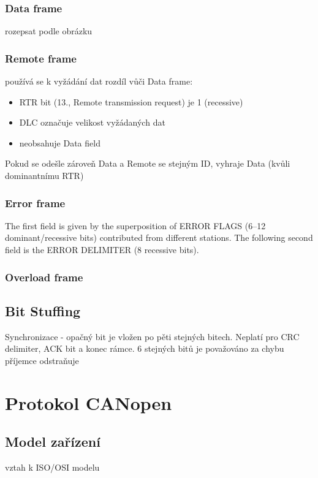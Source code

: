 \documentclass[
  field=ainfk,
  biblatex,
  glossaries,
  index
]{kidiplom}
\begin{document}
\subsubsection{Data frame}
rozepsat podle obrázku
\subsubsection{Remote frame}
používá se k vyžádání dat
rozdíl vůči Data frame:
\begin{itemize}
	\item RTR bit (13., Remote transmission request) je 1 (recessive)
	\item DLC označuje velikost vyžádaných dat
	\item neobsahuje Data field
\end{itemize}
Pokud se odešle zároveň Data a Remote se stejným ID, vyhraje Data (kvůli dominantnímu RTR)

\subsubsection{Error frame}
The first field is given by the superposition of ERROR FLAGS (6–12 dominant/recessive bits) contributed from different stations.
The following second field is the ERROR DELIMITER (8 recessive bits).

\subsubsection{Overload frame}

\subsection{Bit Stuffing}
Synchronizace - opačný bit je vložen po pěti stejných bitech. Neplatí pro CRC delimiter, ACK bit a konec rámce. 6 stejných bitů je považováno za chybu
příjemce odstraňuje

\section{Protokol CANopen}

\subsection{Model zařízení}

vztah k ISO/OSI modelu
\end{document}
